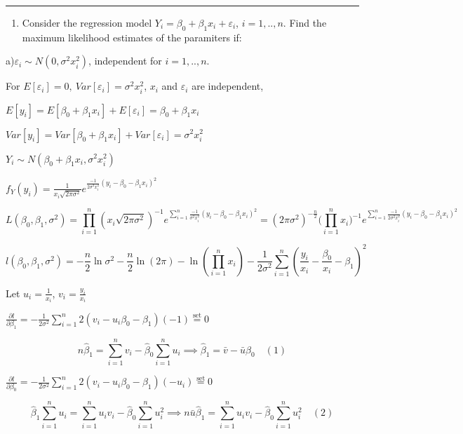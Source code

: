 \documentclass[12pt,]{article}
\providecommand{\tightlist}{%
  \setlength{\itemsep}{0pt}\setlength{\parskip}{0pt}}
\begin{document}
\begin{center}\rule{0.5\linewidth}{\linethickness}\end{center}

\begin{enumerate}
\def\labelenumi{\arabic{enumi}.}
\setcounter{enumi}{1}
\tightlist
\item
  Consider the regression model
  \(Y_i=\beta_0+\beta_1x_i+\varepsilon_i\), \(i=1,..,n\). Find the
  maximum likelihood estimates of the paramiters if:
\end{enumerate}

a)\(\varepsilon_i\sim N(0,\sigma^2x_i^2)\), independent for
\(i=1,..,n\).

For \(E[\varepsilon_i]=0,\ Var[\varepsilon_i]=\sigma^2x_i^2\), \(x_i\)
and \(\varepsilon_i\) are independent,

\(E[y_i]=E[\beta_0+\beta_1x_i]+E[\varepsilon_i]=\beta_0+\beta_1x_i\)

\(Var[y_i]=Var[\beta_0+\beta_1x_i]+Var[\varepsilon_i]=\sigma^2x_i^2\)

\(Y_i\sim N(\beta_0+\beta_1x_i,\sigma^2x_i^2)\)

\(f_Y(y_i)=\frac{1}{ x_i\sqrt{2\pi\sigma^2}}e^{\frac{-1}{2\sigma^2x_i^2}(y_i-\beta_0-\beta_1x_i)^2}\)

\[L(\beta_0,\beta_1,\sigma^2)=\prod_{i=1}^{n}({ x_i\sqrt{2\pi\sigma^2}})^{-1}e^{\sum_{i=1}^{n}\frac{-1}{\sigma^2x_i^2}(y_i-\beta_0-\beta_1x_i)^2}={(2\pi\sigma^2)^{-\frac{n}2} (\prod_{i=1}^{n}x_i})^{-1}e^{\sum_{i=1}^{n}\frac{-1}{2\sigma^2x_i^2}(y_i-\beta_0-\beta_1x_i)^2}\]

\[l(\beta_0,\beta_1,\sigma^2)=-\frac{n}2\ln\sigma^2-\frac{n}{2}\ln{(2\pi)}-\ln(\prod_{i=1}^{n}x_i)-\frac{1}{2\sigma^2}\sum_{i=1}^{n}(\frac{y_i}{x_i}-\frac{\beta_0}{x_i}-\beta_1)^2\]

Let \(u_i=\frac{1}{x_i}\), \(v_i=\frac{y_i}{x_i}\)

\(\frac{\partial l}{\partial\beta_1}=-\frac{1}{2\sigma^2}\sum_{i=1}^{n}2(v_i-u_i\beta_0-\beta_1)(-1)\overset{\text{set}}{=}0\)

\[n\hat\beta_1=\sum_{i=1}^{n}v_i-\hat\beta_0\sum_{i=1}^{n}u_i\implies\hat\beta_1=\bar v-\bar u\hat\beta_0\quad (1)\]

\(\frac{\partial l}{\partial\beta_0}=-\frac{1}{2\sigma^2}\sum_{i=1}^{n}2(v_i-u_i\beta_0-\beta_1)(-u_i)\overset{\text{set}}{=}0\)

\[\hat\beta_1\sum_{i=1}^{n}u_i=\sum_{i=1}^{n}u_iv_i-\hat\beta_0\sum_{i=1}^{n}u_i^2\implies n\bar u\hat\beta_1=\sum_{i=1}^{n}u_iv_i-\hat\beta_0\sum_{i=1}^{n}u_i^2\quad (2)\]
\end{document}

